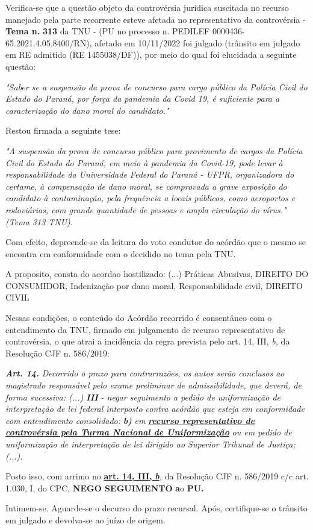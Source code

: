\documentclass[12pt]{article}
\begin{document}
\justifying
\noindent Verifica-se que a questão objeto da controvérsia jurídica suscitada no recurso manejado pela parte recorrente esteve afetada no representativo da controvérsia - \textbf{Tema n. }\textbf{313} da TNU - (PU no processo n. PEDILEF 0000436-65.2021.4.05.8400/RN),  afetado em 10/11/2022 foi julgado (trânsito em julgado em RE admitido (RE 1455038/DF)), por meio do qual foi elucidada a seguinte questão:

\noindent \textit{"Saber se a suspensão da prova de concurso para cargo público da Polícia Civil do Estado do Paraná, por força da pandemia da Covid 19, é suficiente para a caracterização do dano moral do candidato."}

\noindent Restou firmada a seguinte tese:

\noindent \textit{"A suspensão da prova de concurso público para provimento de cargos da Polícia Civil do Estado do Paraná, em meio à pandemia da Covid-19, pode levar à responsabilidade da Universidade Federal do Paraná - UFPR, organizadora do certame, à compensação de dano moral, se comprovada a grave exposição do candidato à contaminação, pela frequência a locais públicos, como aeroportos e rodoviárias, com grande quantidade de pessoas e ampla circulação do vírus." (Tema 313 TNU).}

\noindent Com efeito, depreende-se da leitura do voto condutor do acórdão que o mesmo se encontra em conformidade com o decidido no  tema pela TNU.

\noindent A proposito, consta do acordao hostilizado: (...) Práticas Abusivas, DIREITO DO CONSUMIDOR, Indenização por dano moral, Responsabilidade civil, DIREITO CIVIL

\noindent Nessas condições, o conteúdo do Acórdão recorrido é consentâneo com o entendimento da TNU, firmado em julgamento de recurso representativo de controvérsia, o que atrai a incidência da regra prevista pelo art. 14, III, \textit{b,} da Resolução CJF n. 586/2019:

\noindent \textit{\textbf{Art. 14.}}\textit{ Decorrido o prazo para contrarrazões, os autos serão conclusos ao magistrado responsável pelo exame preliminar de admissibilidade, que deverá, de forma sucessiva: (...) }\textit{\textbf{III }}\textit{- negar seguimento a pedido de uniformização de interpretação de lei federal interposto contra acórdão que esteja em conformidade com entendimento consolidado: }\textit{\textbf{b)}}\textit{ em }\uline{\textit{\textbf{recurso representativo de controvérsia pela Turma Nacional de Uniformização}}}\textit{ ou em pedido de uniformização de interpretação de lei dirigido ao Superior Tribunal de Justiça;(...).}

\noindent Posto isso, com arrimo no \uline{\textbf{art. 14, III, }}\uline{\textit{\textbf{b}}}\textit{,} da Resolução CJF n. 586/2019 c/c art. 1.030, I, do CPC, \textbf{NEGO SEGUIMENTO }\textbf{a}o\textbf{ PU}\textbf{.}

\noindent Intimem-se. Aguarde-se o decurso do prazo recursal. Após, certifique-se o trânsito em julgado e devolva-se ao juízo de origem.
\end{document}

